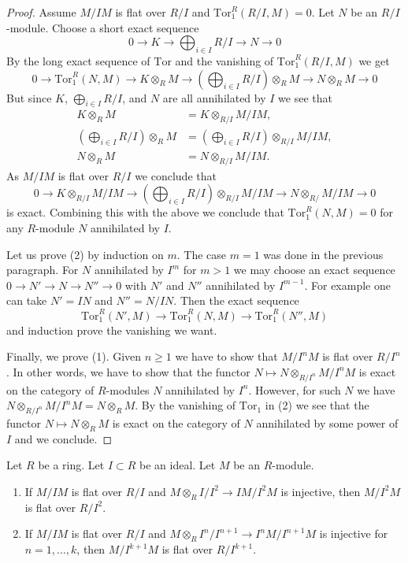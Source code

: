 \begin{proof}
Assume $M/IM$ is flat over $R/I$ and $\text{Tor}_1^R(R/I, M) = 0$.
Let $N$ be an $R/I$-module. Choose a short exact sequence
$$
0 \to K \to \bigoplus\nolimits_{i \in I} R/I \to N \to 0
$$
By the long exact sequence of $\text{Tor}$ and the vanishing of
$\text{Tor}_1^R(R/I, M)$ we get
$$
0 \to \text{Tor}_1^R(N, M) \to K \otimes_R M \to
(\bigoplus\nolimits_{i \in I} R/I) \otimes_R M \to N \otimes_R M \to 0
$$
But since $K$, $\bigoplus_{i \in I} R/I$, and $N$ are all annihilated
by $I$ we see that
\begin{align*}
K \otimes_R M & = K \otimes_{R/I} M/IM, \\
(\bigoplus\nolimits_{i \in I} R/I) \otimes_R M & =
(\bigoplus\nolimits_{i \in I} R/I) \otimes_{R/I} M/IM, \\
N \otimes_R M & = N \otimes_{R/I} M/IM.
\end{align*}
As $M/IM$ is flat over $R/I$ we conclude that
$$
0 \to K \otimes_{R/I} M/IM \to
(\bigoplus\nolimits_{i \in I} R/I) \otimes_{R/I} M/IM \to
N \otimes_{R/} M/IM \to 0
$$
is exact. Combining this with the above we conclude that
$\text{Tor}_1^R(N, M) = 0$ for any $R$-module $N$ annihilated by $I$.

\medskip\noindent
Let us prove (2) by induction on $m$. The case $m = 1$ was
done in the previous paragraph. For $N$ annihilated by $I^m$
for $m > 1$ we may choose an exact sequence
$0 \to N' \to N \to N'' \to 0$ with $N'$ and $N''$ annihilated
by $I^{m - 1}$. For example one can take $N' = IN$ and $N'' = N/IN$.
Then the exact sequence
$$
\text{Tor}_1^R(N', M) \to
\text{Tor}_1^R(N, M) \to
\text{Tor}_1^R(N'', M)
$$
and induction prove the vanishing we want.

\medskip\noindent
Finally, we prove (1). Given $n \geq 1$ we have to show that $M/I^nM$
is flat over $R/I^n$. In other words, we have to show that the functor
$N \mapsto N \otimes_{R/I^n} M/I^nM$ is exact on the category of $R$-modules
$N$ annihilated by $I^n$. However, for such $N$ we have
$N \otimes_{R/I^n} M/I^nM = N \otimes_R M$. By the vanishing of
$\text{Tor}_1$ in (2) we see that the functor $N \mapsto N \otimes_R M$
is exact on the category of $N$ annihilated by some power of $I$
and we conclude.
\end{proof}

\begin{lemma}
\label{lemma-what-does-it-mean-again}
Let $R$ be a ring. Let $I \subset R$ be an ideal.
Let $M$ be an $R$-module.
\begin{enumerate}
\item If $M/IM$ is flat over $R/I$ and $M \otimes_R I/I^2 \to IM/I^2M$
is injective, then $M/I^2M$ is flat over $R/I^2$.
\item If $M/IM$ is flat over $R/I$ and $M \otimes_R I^n/I^{n + 1}
\to I^nM/I^{n + 1}M$ is injective for $n = 1, \ldots, k$,
then $M/I^{k + 1}M$ is flat over $R/I^{k + 1}$.
\end{enumerate}
\end{lemma}

